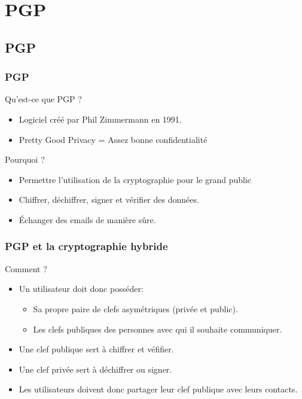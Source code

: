 \section{PGP}
\subsection{PGP}
\begin{frame}
    \frametitle{\color{white}PGP}
    \begin{block}{Qu'est-ce que PGP ?}
      \begin{itemize}
       \item Logiciel créé par Phil Zimmermann en 1991.
         \item Pretty Good Privacy = Assez bonne confidentialité
       \end{itemize} 
    \end{block}
    \begin{block}{Pourquoi ?}
      \begin{itemize}
         \item Permettre l'utilisation de la cryptographie pour le grand public
         \item Chiffrer, déchiffrer, signer et vérifier des données. 
         \item Échanger des emails de manière sûre.
       \end{itemize} 
    \end{block}
\end{frame}
\begin{frame}
    \frametitle{\color{white}PGP et la cryptographie hybride}
    \begin{block}{Comment ?}
    	\begin{itemize}
         \item Un utilisateur doit donc posséder:
	  \begin{itemize}
	    \item Sa propre paire de clefs asymétriques (privée et public).
	    \item Les clefs publiques des personnes avec qui il souhaite communiquer. 
	  \end{itemize}
	 \item Une clef publique sert à chiffrer et véfifier.
	 \item Une clef privée sert à déchiffrer ou signer.
	 \item Les utilisateurs doivent donc partager leur clef publique avec leurs contacts.
       \end{itemize} 
    \end{block}
\end{frame}

